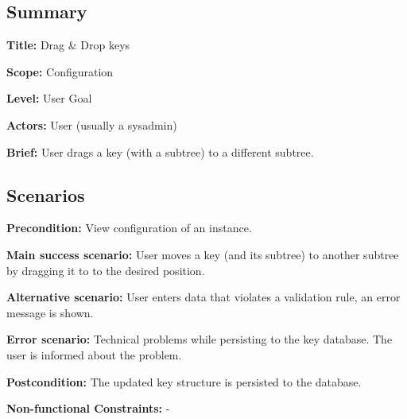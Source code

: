 \subsection*{Summary}


\begin{DoxyItemize}
\item {\bfseries Title\+:} Drag \& Drop keys
\item {\bfseries Scope\+:} Configuration
\item {\bfseries Level\+:} User Goal
\item {\bfseries Actors\+:} User (usually a sysadmin)
\item {\bfseries Brief\+:} User drags a key (with a subtree) to a different subtree.
\end{DoxyItemize}

\subsection*{Scenarios}


\begin{DoxyItemize}
\item {\bfseries Precondition\+:} View configuration of an instance.
\item {\bfseries Main success scenario\+:} User moves a key (and its subtree) to another subtree by dragging it to to the desired position.
\item {\bfseries Alternative scenario\+:} User enters data that violates a validation rule, an error message is shown.
\item {\bfseries Error scenario\+:} Technical problems while persisting to the key database. The user is informed about the problem.
\item {\bfseries Postcondition\+:} The updated key structure is persisted to the database.
\item {\bfseries Non-\/functional Constraints\+:} -\/ 
\end{DoxyItemize}